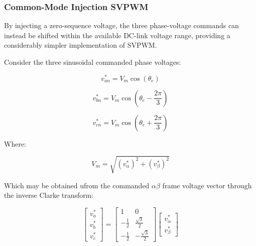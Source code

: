 \documentclass{article}
\begin{document}
\subsubsection{Common-Mode Injection SVPWM}
\label{sec:common-mode-injection-svpwm}

By injecting a zero-sequence voltage, the three phase-voltage commands can instead be shifted within the available DC-link voltage range, providing a considerably simpler implementation of SVPWM.

Consider the three sinusoidal commanded phase voltages:

\begin{equation}
    v_{an}^* = V_m\cos(\theta_e)
\end{equation}

\begin{equation}
    v_{bn}^* = V_m\cos(\theta_e - \frac{2\pi}{3})
\end{equation}

\begin{equation}
    v_{cn}^* = V_m\cos(\theta_e + \frac{2\pi}{3})
\end{equation}

Where:

\begin{equation}
    V_m = \sqrt{(v_\alpha^*)^2 + (v_\beta^*)^2}
\end{equation}

Which may be obtained ufrom the commanded $\alpha\beta$ frame voltage vector through the inverse Clarke transform:

\begin{equation}
    \begin{bmatrix}
        v_a^* \\
        v_b^* \\
        v_c^*
    \end{bmatrix}
    =
    \begin{bmatrix}
        1 & 0 \\
        -\frac{1}{2} & \frac{\sqrt{3}}{2} \\
        -\frac{1}{2} & -\frac{\sqrt{3}}{2}
    \end{bmatrix}
    \begin{bmatrix}
        v_\alpha^* \\
        v_\beta^*
    \end{bmatrix}
\end{equation}
\end{document}
